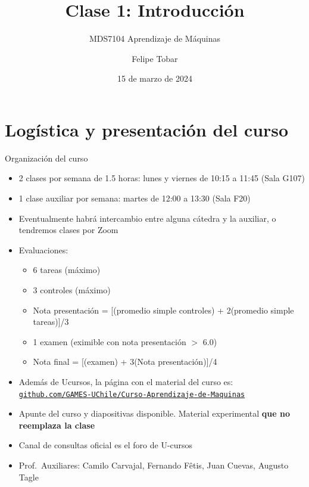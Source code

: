 \documentclass[9pt]{beamer}
\title{Clase 1: Introducción}
\subtitle{MDS7104 Aprendizaje de Máquinas}
\date{15 de marzo de 2024}
\author{Felipe Tobar}
\institute{Iniciativa de Datos e Inteligencia Artificial\\Universidad de Chile}
\begin{document}
\begin{frame}
  \titlepage
\end{frame}

\section{Logística y presentación del curso}
\begin{frame}{Organización del curso}

\begin{itemize}
  \item 2 clases por semana de 1.5 horas: lunes y viernes de 10:15 a 11:45 (Sala G107)
  \item 1 clase auxiliar por semana: martes de 12:00 a 13:30 (Sala F20) 
  \item Eventualmente habrá intercambio entre alguna cátedra y la auxiliar, o tendremos clases por Zoom
  \item Evaluaciones: 
  \begin{itemize}
    \item 6 tareas (máximo)
    \item 3 controles (máximo) 
    \item Nota presentación = [(promedio simple controles) + 2(promedio simple tareas)]/3
    \item 1 examen (eximible con nota presentación $>$ 6.0)
    \item Nota final = [(examen) + 3(Nota presentación)]/4
  \end{itemize}
  \item Además de Ucursos, la página con el material del curso es: \href{https://github.com/GAMES-UChile/Curso-Aprendizaje-de-Maquinas}{\tt github.com/GAMES-UChile/Curso-Aprendizaje-de-Maquinas}
  \item Apunte del curso y diapositivas disponible. Material experimental \textbf{que no reemplaza la clase}
  \item Canal de consultas oficial es el foro de U-cursos
  \item Prof.~Auxiliares: Camilo Carvajal, Fernando F\^etis, Juan Cuevas, Augusto Tagle
\end{itemize}

\end{frame}
\end{document}
